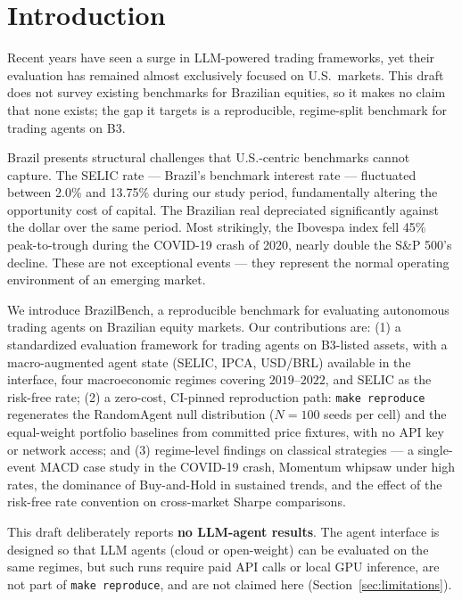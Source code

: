 \documentclass{article}
\begin{document}
\section{Introduction}

Recent years have seen a surge in LLM-powered trading frameworks, yet
their evaluation has remained almost exclusively focused on U.S.\ markets.
This draft does not survey existing benchmarks for Brazilian equities, so
it makes no claim that none exists; the gap it targets is a reproducible,
regime-split benchmark for trading agents on B3.

Brazil presents structural challenges that U.S.-centric benchmarks cannot
capture. The SELIC rate --- Brazil's benchmark interest rate --- fluctuated
between 2.0\% and 13.75\% during our study period, fundamentally altering
the opportunity cost of capital. The Brazilian real depreciated
significantly against the dollar over the same period. Most strikingly,
the Ibovespa index fell 45\% peak-to-trough during the COVID-19 crash
of 2020, nearly double the S\&P 500's decline. These are not exceptional
events --- they represent the normal operating environment of an emerging
market.

We introduce BrazilBench, a reproducible benchmark for evaluating
autonomous trading agents on Brazilian equity markets. Our contributions
are: (1) a standardized evaluation framework for trading agents on
B3-listed assets, with a macro-augmented agent state (SELIC, IPCA,
USD/BRL) available in the interface, four macroeconomic regimes
covering $2019$--$2022$, and SELIC as the risk-free rate; (2) a
zero-cost, CI-pinned reproduction path: \texttt{make reproduce}
regenerates the RandomAgent null distribution ($N{=}100$ seeds per
cell) and the equal-weight portfolio baselines from committed price
fixtures, with no API key or network access; and (3) regime-level
findings on classical strategies --- a single-event MACD case study
in the COVID-19 crash, Momentum whipsaw under high rates, the
dominance of Buy-and-Hold in sustained trends, and the effect of the
risk-free rate convention on cross-market Sharpe comparisons.

This draft deliberately reports \textbf{no LLM-agent results}. The
agent interface is designed so that LLM agents (cloud or open-weight)
can be evaluated on the same regimes, but such runs require paid API
calls or local GPU inference, are not part of \texttt{make reproduce},
and are not claimed here (Section~\ref{sec:limitations}).
\end{document}
